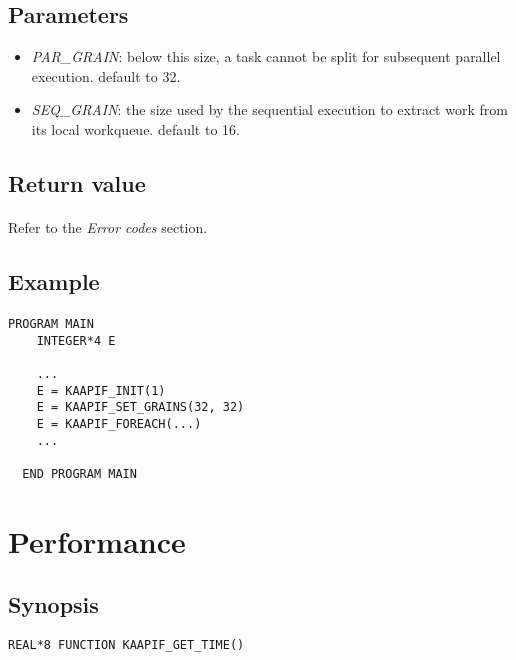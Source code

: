 \documentclass[a4paper, 11pt]{article}
\begin{document}
\subsection{Parameters}
\begin{itemize}
\item \textit{PAR\_GRAIN}: below this size, a task cannot be split for
subsequent parallel execution. default to 32.
\item \textit{SEQ\_GRAIN}: the size used by the sequential execution to
extract work from its local workqueue. default to 16.
\end{itemize}

\subsection{Return value}
\paragraph{}
Refer to the \textit{Error codes} section.

\subsection{Example}
\paragraph{}
\begin{small}
\begin{lstlisting}[frame=tb]
  PROGRAM MAIN
    INTEGER*4 E

    ...
    E = KAAPIF_INIT(1)
    E = KAAPIF_SET_GRAINS(32, 32)
    E = KAAPIF_FOREACH(...)
    ...

  END PROGRAM MAIN
\end{lstlisting}
\end{small}


\newpage
\section{Performance}

\subsection{Synopsis}
\begin{small}
\lstset{language=C}
\begin{lstlisting}[frame=tb]
REAL*8 FUNCTION KAAPIF_GET_TIME()
\end{lstlisting}
\end{small}
\end{document}

